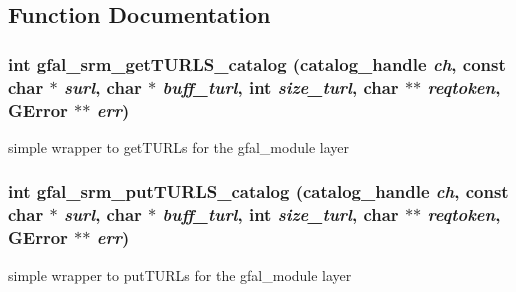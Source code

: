 \subsection{Function Documentation}
\subsubsection{\setlength{\rightskip}{0pt plus 5cm}int gfal\_\-srm\_\-get\-TURLS\_\-catalog (catalog\_\-handle {\em ch}, const char $\ast$ {\em surl}, char $\ast$ {\em buff\_\-turl}, int {\em size\_\-turl}, char $\ast$$\ast$ {\em reqtoken}, GError $\ast$$\ast$ {\em err})}\label{gfal__common__srm__internal__layer_8h_c51b90df2c43b149ad2f80afeb9200ed}


simple wrapper to get\-TURLs for the gfal\_\-module layer 
\subsubsection{\setlength{\rightskip}{0pt plus 5cm}int gfal\_\-srm\_\-put\-TURLS\_\-catalog (catalog\_\-handle {\em ch}, const char $\ast$ {\em surl}, char $\ast$ {\em buff\_\-turl}, int {\em size\_\-turl}, char $\ast$$\ast$ {\em reqtoken}, GError $\ast$$\ast$ {\em err})}\label{gfal__common__srm__internal__layer_8h_96bb61a1e4df92a074a6e173b8c02b4d}


simple wrapper to put\-TURLs for the gfal\_\-module layer 